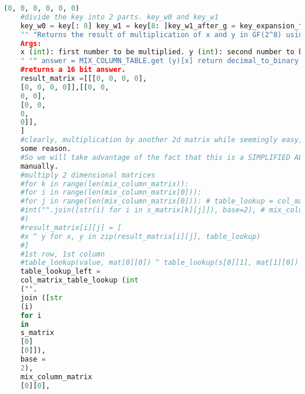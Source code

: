 \documentclass{article}
\begin{document}
\begin{lstlisting}[language=python, caption={Input Code}]
	(0, 0, 0, 0, 0, 0)
	#divide the key into 2 parts. key_w0 and key_w1
	key_w0 = key[: 8] key_w1 = key[8: ]key_w1_after_g = key_expansion_function_g (key_w1, 0) key_w2 =[x ^ y for x, y in zip (key_w0, key_w1_after_g)] key_w3 =[x ^ y for x, y in zip (key_w1, key_w2)] key_w3_after_g = key_expansion_function_g (key_w3, 1) key_w4 =[x ^ y for x, y in zip (key_w2, key_w3_after_g)] key_w5 =[x ^ y for x, y in zip (key_w3, key_w4)] return key_w0 + key_w1, key_w2 + key_w3, key_w4 + key_w5 def col_matrix_table_lookup (x, y):
	"" "Returns the result of multiplication of x and y in GF(2^8) using MIX_COLUMN_TABLE.
	Args:
	x (int): first number to be multiplied. y (int): second number to be multiplied.
	" "" answer = MIX_COLUMN_TABLE.get (y)[x] return decimal_to_binary (int (answer), 4) def mix_columns (s_matrix, mix_column_matrix):
	#returns a 16 bit answer.
	result_matrix =[[[0, 0, 0, 0],
	[0, 0, 0, 0]],[[0, 0,
	0, 0],
	[0, 0,
	0,
	0]],
	]
	#clearly, multiplication by another 2d matrix while seemingly easy, doesnt work for
	some reason.
	#So we will take advantage of the fact that this is a SIMPLIFIED AES cipher, and do it
	manually.
	#multiply 2 dimensional matrices
	#for k in range(len(mix_column_matrix)):
	#for i in range(len(mix_column_matrix[0])):
	#for j in range(len(mix_column_matrix[0])): # table_lookup = col_matrix_table_lookup(
	#int("".join([str(i) for i in s_matrix[k][j]]), base=2), # mix_column_matrix[i][k],
	#)
	#result_matrix[i][j] = [
	#x ^ y for x, y in zip(result_matrix[i][j], table_lookup)
	#]
	#1st row, 1st column
	#table_lookup(value, mat[0][0]) ^ table_lookup(s[0][1], mat[1][0])
	table_lookup_left =
	col_matrix_table_lookup (int
	("".
	join ([str
	(i)
	for i
	in
	s_matrix
	[0]
	[0]]),
	base =
	2),
	mix_column_matrix
	[0][0],
	

\end{lstlisting}
\end{document}
